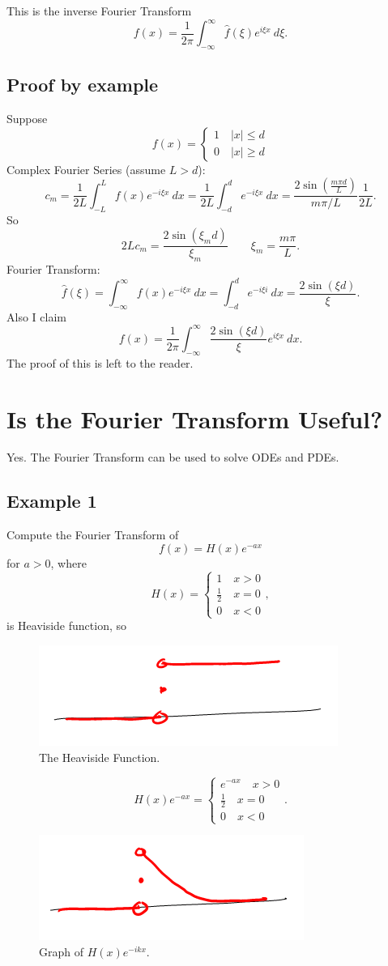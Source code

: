 \documentclass[cm]{article}
\newcommand{\fhat}{\hat{f}}
\newcommand{\xt}{\xi_m}
\begin{document}
This is the inverse Fourier Transform
$$ f(x) = \frac{1}{2 \pi} \int_{- \infty}^{\infty} \fhat(\xi) e^{i \xi x}~d\xi.$$
\subsection{Proof by example}
Suppose 
$$f(x) = \begin{cases}
1 \quad |x| \leq d\\
0 \quad |x| \geq d
\end{cases}$$
Complex Fourier Series (assume $L > d$):
$$c_m = \frac{1}{2L} \int_{-L}^L f(x) e^{-i \xi x}~dx = \frac{1}{2L} \int_{-d}^d e^{-i \xi x}~dx = \frac{2\sin(\frac{m \pi d}{L})}{m \pi / L} \frac{1}{2L}.$$
So
$$ 2L c_m = \frac{2 \sin(\xt d)}{\xt} \qquad \xt = \frac{m \pi}{L}.$$
Fourier Transform:
$$ \fhat(\xi) = \int_{-\infty}^{\infty} f(x) e^{-i \xi x}~dx = \int_{-d}^d e^{-i \xi i}~dx = \frac{2 \sin(\xi d)}{\xi}.$$
Also I claim
$$ f(x) = \frac{1}{2 \pi} \int_{-\infty}^{\infty} \frac{2 \sin(\xi d)}{\xi} e^{i \xi x}~dx.$$
The proof of this is left to the reader.
\section{Is the Fourier Transform Useful?}
Yes. The Fourier Transform can be used to solve ODEs and PDEs.
\subsection{Example 1}
Compute the Fourier Transform of
$$f(x) = H(x) e^{-ax}$$
for $a > 0$, where
$$H(x) = \begin{cases} 1 \quad x > 0 \\ \frac12 \quad x = 0 \\ 0 \quad x < 0\end{cases},$$
is Heaviside function, so 
\begin{figure}
	\centering
		\includegraphics{10-28-2010-heaviside.png}
	\caption{The Heaviside Function.}
	\label{fig:heaviside}
\end{figure}
$$H(x)e^{-ax} = \begin{cases} e^{-ax} \quad x > 0 \\ \frac12 \quad x = 0 \\ 0 \quad x < 0 \end{cases}.$$
\begin{figure}
	\centering
		\includegraphics{10-28-2010-heavisideT.png}
	\caption{Graph of $H(x)e^{-ikx}$.}
	\label{fig:heavisideT}
\end{figure}
\end{document}
